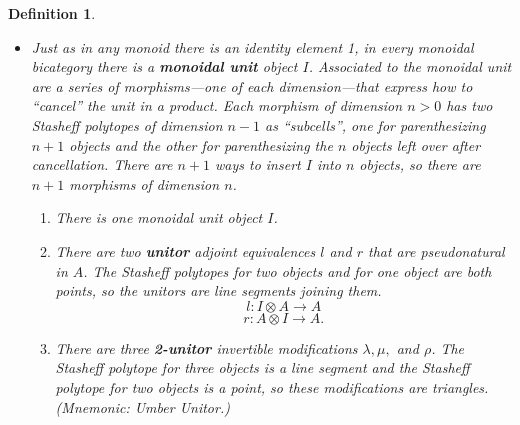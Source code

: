 \documentclass[12pt,twoside,openright]{report}
\newtheorem{defn}{Definition}
\newcommand{\maps}{\colon}
\newcommand{\tensor}{\otimes}
\begin{document}
\begin{defn}
\begin{itemize}
\item Just as in any monoid there is an identity element 1, in every monoidal bicategory there is a {\bf monoidal unit} object $I$. Associated to the monoidal unit are a series of morphisms---one of each dimension---that express how to ``cancel'' the unit in a product. Each morphism of dimension $n>0$ has two Stasheff polytopes of dimension
$n-1$ as ``subcells'', one for parenthesizing $n+1$
objects and the other for parenthesizing the $n$ objects left over after cancellation.  There are $n+1$ ways to insert $I$ into 
$n$ objects, so there are $n+1$ morphisms of dimension $n$.
  \begin{enumerate}
    \item There is one monoidal unit object $I$.
    \item There are two {\bf unitor} adjoint equivalences $l$ and $r$
that are pseudonatural in $A$.  The Stasheff polytopes for two objects and for one object are both points, so the unitors are line segments joining them.
        \[ l\maps I \tensor A \rightarrow A \]
        \[ r\maps A \tensor I \rightarrow A. \]
    \item There are three {\bf 2-unitor} invertible modifications
$\lambda, \mu,$ and $\rho$. The Stasheff polytope for three objects is a line segment and the Stasheff polytope for two objects is a point, so these modifications are triangles.  (Mnemonic: Umber Unitor.)
      \begin{center}
      \end{center}
      \begin{center}
\end{center}
\end{enumerate}
\end{itemize}
\end{defn}
\end{document}
